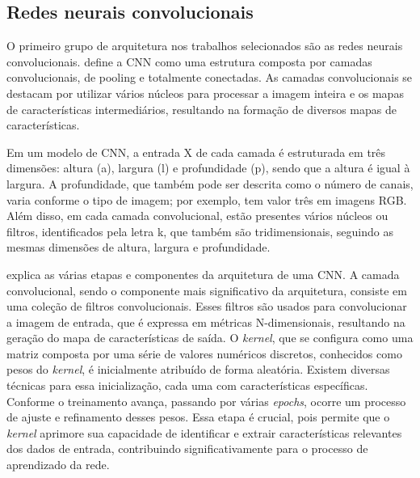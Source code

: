 \subsection{Redes neurais convolucionais}
\label{subsec:Redes neurais convolucionais}



O primeiro grupo de arquitetura nos trabalhos selecionados são as redes neurais convolucionais. \textcite{CHAI2021100134} define a CNN como uma estrutura composta por camadas convolucionais, de pooling e totalmente conectadas. As camadas convolucionais se destacam por utilizar vários núcleos para processar a imagem inteira e os mapas de características intermediários, resultando na formação de diversos mapas de características.

Em um modelo de CNN, a entrada X de cada camada é estruturada em três dimensões: altura (a), largura (l) e profundidade (p), sendo que a altura é igual à largura. A profundidade, que também pode ser descrita como o número de canais, varia conforme o tipo de imagem; por exemplo, tem valor três em imagens RGB. Além disso, em cada camada convolucional, estão presentes vários núcleos ou filtros, identificados pela letra k, que também são tridimensionais, seguindo as mesmas dimensões de altura, largura e profundidade.

\textcite{Alzubaidi2021} explica as várias etapas e componentes da arquitetura de uma CNN. A camada convolucional, sendo o componente mais significativo da arquitetura, consiste em uma coleção de filtros convolucionais. Esses filtros são usados para convolucionar a imagem de entrada, que é expressa em métricas N-dimensionais, resultando na geração do mapa de características de saída. O \textit{kernel}, que se configura como uma matriz composta por uma série de valores numéricos discretos, conhecidos como pesos do \textit{kernel}, é inicialmente atribuído de forma aleatória. Existem diversas técnicas para essa inicialização, cada uma com características específicas. Conforme o treinamento avança, passando por várias \textit{epochs}, ocorre um processo de ajuste e refinamento desses pesos. Essa etapa é crucial, pois permite que o \textit{kernel} aprimore sua capacidade de identificar e extrair características relevantes dos dados de entrada, contribuindo significativamente para o processo de aprendizado da rede.

